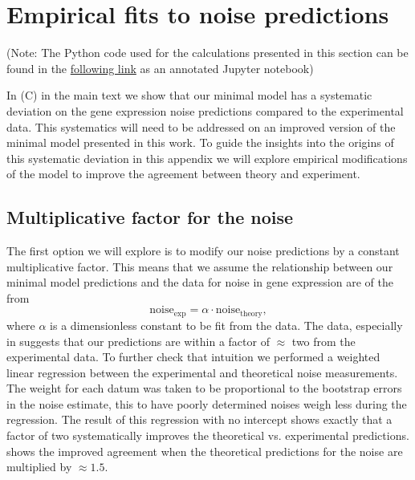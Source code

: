 \section{Empirical fits to noise predictions} \label{supp_empirical}

(Note: The Python code used for the calculations presented in this section can
be found in the
\href{https://www.rpgroup.caltech.edu/chann_cap/src/theory/html/empirical_constants.html}{following
link} as an annotated Jupyter notebook)

In (C) in the main text we show that our minimal model has
a systematic deviation on the gene expression noise predictions compared to the
experimental data. This systematics will need to be addressed on an improved
version of the minimal model presented in this work. To guide the insights into
the origins of this systematic deviation in this appendix we will explore
empirical modifications of the model to improve the agreement between theory and
experiment.

\subsection{Multiplicative factor for the noise}
\label{supp_mult_factor_noise}

The first option we will explore is to modify our noise predictions by a
constant multiplicative factor. This means that we assume the relationship
between our minimal model predictions and the data for noise in gene expression
are of the from
\begin{equation}
    \text{noise}_{\text{exp}} = \alpha \cdot \text{noise}_{\text{theory}},
\end{equation}
where $\alpha$ is a dimensionless constant to be fit from the data. The data,
especially in  suggests that our predictions are within a
factor of $\approx$ two from the experimental data. To further check that
intuition we performed a weighted linear regression between the experimental and
theoretical noise measurements. The weight for each datum was taken to be
proportional to the bootstrap errors in the noise estimate, this to have poorly
determined noises weigh less during the regression. The result of this
regression with no intercept shows exactly that a factor of two systematically
improves the theoretical vs. experimental predictions.
 shows the improved agreement when the theoretical
predictions for the noise are multiplied by $\approx 1.5$.

